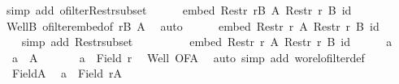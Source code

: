 \begin{isabellebody}
\ {\isacharparenleft}{\kern0pt}simp\ add{\isacharcolon}{\kern0pt}\ ofilter{\isacharunderscore}{\kern0pt}Restr{\isacharunderscore}{\kern0pt}subset{\isacharparenright}{\kern0pt}\isanewline
\ \ \ \ \isamarkupfalse%
\ {\isachardoublequoteopen}embed\ {\isacharparenleft}{\kern0pt}Restr\ {\isacharquery}{\kern0pt}rB\ A{\isacharparenright}{\kern0pt}\ {\isacharparenleft}{\kern0pt}Restr\ r\ B{\isacharparenright}{\kern0pt}\ id{\isachardoublequoteclose}\isanewline
\ \ \ \ \isamarkupfalse%
\ WellB\ ofilter{\isacharunderscore}{\kern0pt}embed{\isacharbrackleft}{\kern0pt}of\ {\isachardoublequoteopen}{\isacharquery}{\kern0pt}rB{\isachardoublequoteclose}\ A{\isacharbrackright}{\kern0pt}\ \isamarkupfalse%
\ auto\isanewline
\ \ \ \ \isamarkupfalse%
\ {\isachardoublequoteopen}embed\ {\isacharparenleft}{\kern0pt}Restr\ r\ A{\isacharparenright}{\kern0pt}\ {\isacharparenleft}{\kern0pt}Restr\ r\ B{\isacharparenright}{\kern0pt}\ id{\isachardoublequoteclose}\isanewline
\ \ \ \ \isamarkupfalse%
\ {\isacharasterisk}{\kern0pt}\ \isamarkupfalse%
\ {\isacharparenleft}{\kern0pt}simp\ add{\isacharcolon}{\kern0pt}\ Restr{\isacharunderscore}{\kern0pt}subset{\isacharparenright}{\kern0pt}\isanewline
\ \ \isamarkupfalse%
\isanewline
\ \ \ \ \isamarkupfalse%
\ {\isacharasterisk}{\kern0pt}{\isacharcolon}{\kern0pt}\ {\isachardoublequoteopen}embed\ {\isacharparenleft}{\kern0pt}Restr\ r\ A{\isacharparenright}{\kern0pt}\ {\isacharparenleft}{\kern0pt}Restr\ r\ B{\isacharparenright}{\kern0pt}\ id{\isachardoublequoteclose}\isanewline
\ \ \ \ \isacommand{{\isacharbraceleft}{\kern0pt}}\isamarkupfalse%
\isamarkupfalse%
\ a\ \isamarkupfalse%
\ {\isacharasterisk}{\kern0pt}{\isacharasterisk}{\kern0pt}{\isacharcolon}{\kern0pt}\ {\isachardoublequoteopen}a\ {\isasymin}\ A{\isachardoublequoteclose}\isanewline
\ \ \ \ \ \isamarkupfalse%
\ {\isachardoublequoteopen}a\ {\isasymin}\ Field\ r{\isachardoublequoteclose}\ \isamarkupfalse%
\ Well\ OFA\ \isamarkupfalse%
\ {\isacharparenleft}{\kern0pt}auto\ simp\ add{\isacharcolon}{\kern0pt}\ wo{\isacharunderscore}{\kern0pt}rel{\isachardot}{\kern0pt}ofilter{\isacharunderscore}{\kern0pt}def{\isacharparenright}{\kern0pt}\isanewline
\ \ \ \ \ \isamarkupfalse%
\ {\isacharasterisk}{\kern0pt}{\isacharasterisk}{\kern0pt}\ FieldA\ \isamarkupfalse%
\ {\isachardoublequoteopen}a\ {\isasymin}\ Field\ {\isacharquery}{\kern0pt}rA{\isachardoublequoteclose}\ \isamarkupfalse%

\end{isabellebody}

